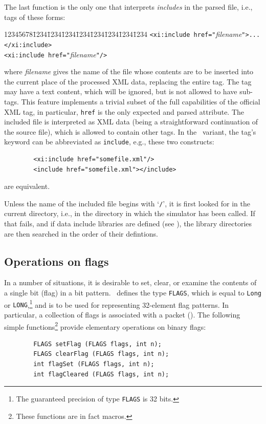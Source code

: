 The last function is the only one that interprets {\em includes\/} in the parsed
file, i.e., tags of these forms:
{\tt\begin{tabbing}
12345678\=1234\=1234\=1234\=1234\=1234\=1234\=1234\=1234\kill
\> {\tt <xi:include href="}{\em filename\/}{\tt ">...</xi:include>}\\
\> {\tt <xi:include href="}{\em filename\/}{\tt "/>}
\end{tabbing}}
\noindent
where {\em filename\/} gives the name of the file whose contents are to be
inserted into the current place of the processed XML data, replacing the entire
{\tt <xi:include>} tag.
The tag may have a text content, which will be ignored, but is not allowed to
have sub-tags.
This feature implements a trivial subset of the full capabilities of the
official XML {\tt <xi:include>} tag, in particular,
{\tt href} is the only expected and parsed attribute.
The included file is interpreted as XML data (being a straightforward
continuation of the source file), which is allowed to contain other
{\tt <xi:include>} tags.
In the \smurph\ variant, the tag's keyword can be abbreviated as {\tt include},
e.g., these two constructs:
\begin{verbatim}
        <xi:include href="somefile.xml"/>
        <include href="somefile.xml"></include>
\end{verbatim}
\noindent
are equivalent.

Unless the name of the included file begins with `{\tt /}', it is first looked
for
in the current directory, i.e., in the directory in which the simulator has
been called.
If that fails, and if data include libraries are defined (see ),
the library directories are then searched in the order of their defintions.

\subsection{Operations on flags}
\label{rm_au_fl}

In a number of situations, it is desirable to set,
clear, or examine the contents of a single bit (flag) in a bit pattern.
\smurph\ defines the type {\tt FLAGS}, which is equal to {\tt Long} or
{\tt LONG},\footnote{The guaranteed precision of type {\tt FLAGS} is 32 bits.}
and is to be used for representing 32-element flag patterns.
In particular, a collection of flags is associated with
a packet ().
The following simple functions\footnote{These functions are in fact
macros.} provide elementary operations on binary flags:
\begin{verbatim}
        FLAGS setFlag (FLAGS flags, int n);
        FLAGS clearFlag (FLAGS flags, int n);
        int flagSet (FLAGS flags, int n);
        int flagCleared (FLAGS flags, int n);
\end{verbatim}

